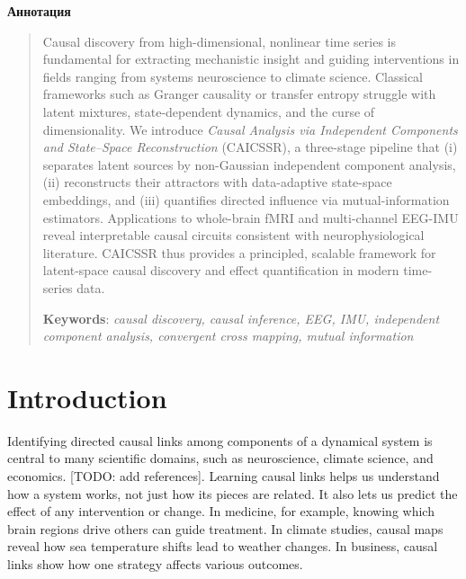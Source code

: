 \documentclass[14pt]{extarticle}
\begin{document}
	
	
	\newpage
	\tableofcontents
	\newpage
	
	\begin{center}
		\Large{\textbf{Аннотация}}
	\end{center}
	
	\begin{abstract}
		Causal discovery from high-dimensional, nonlinear time series is fundamental for extracting mechanistic insight and guiding interventions in fields ranging from systems neuroscience to climate science.  
		Classical frameworks such as Granger causality or transfer entropy struggle with latent mixtures, state-dependent dynamics, and the curse of dimensionality.  
		We introduce \emph{Causal Analysis via Independent Components and State–Space Reconstruction} (CAICSSR), a three-stage pipeline that (i) separates latent sources by non-Gaussian independent component analysis, (ii) reconstructs their attractors with data-adaptive state-space embeddings, and (iii) quantifies directed influence via mutual-information estimators.  
		Applications to whole-brain fMRI and multi-channel EEG-IMU reveal interpretable causal circuits consistent with neurophysiological literature.  
		CAICSSR thus provides a principled, scalable framework for latent-space causal discovery and effect quantification in modern time-series data.
		
		\bigskip
		\textbf{Keywords}: \emph{causal discovery, causal inference, EEG, IMU, independent component analysis, convergent cross mapping, mutual information}
	\end{abstract}
	
	\newpage
	
	\section{Introduction}
	
	Identifying directed causal links among components of a dynamical system is central to many scientific domains, such as neuroscience, climate science, and economics. [TODO: add references].
	Learning causal links helps us understand how a system works, not just how its pieces are related.  
	It also lets us predict the effect of any intervention or change.  
	In medicine, for example, knowing which brain regions drive others can guide treatment.  
	In climate studies, causal maps reveal how sea temperature shifts lead to weather changes.  
	In business, causal links show how one strategy affects various outcomes.  
	
\end{document}
